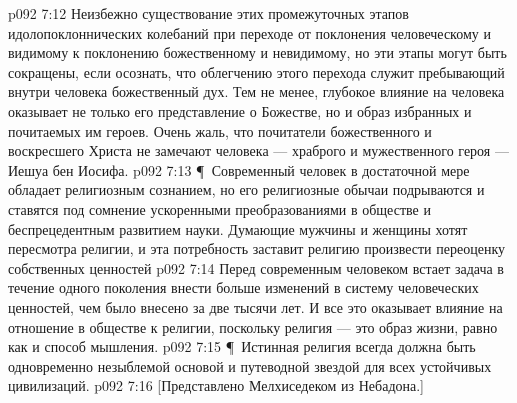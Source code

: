 \vs p092 7:12 Неизбежно существование этих промежуточных этапов идолопоклоннических колебаний при переходе от поклонения человеческому и видимому к поклонению божественному и невидимому, но эти этапы могут быть сокращены, если осознать, что облегчению этого перехода служит пребывающий внутри человека божественный дух. Тем не менее, глубокое влияние на человека оказывает не только его представление о Божестве, но и образ избранных и почитаемых им героев. Очень жаль, что почитатели божественного и воскресшего Христа не замечают человека --- храброго и мужественного героя --- Иешуа бен Иосифа.
\vs p092 7:13 \P\ Современный человек в достаточной мере обладает религиозным сознанием, но его религиозные обычаи подрываются и ставятся под сомнение ускоренными преобразованиями в обществе и беспрецедентным развитием науки. Думающие мужчины и женщины хотят пересмотра религии, и эта потребность заставит религию произвести переоценку собственных ценностей
\vs p092 7:14 Перед современным человеком встает задача в течение одного поколения внести больше изменений в систему человеческих ценностей, чем было внесено за две тысячи лет. И все это оказывает влияние на отношение в обществе к религии, поскольку религия --- это образ жизни, равно как и способ мышления.
\vs p092 7:15 \P\ Истинная религия всегда должна быть одновременно незыблемой основой и путеводной звездой для всех устойчивых цивилизаций.
\vs p092 7:16 [Представлено Мелхиседеком из Небадона.]
